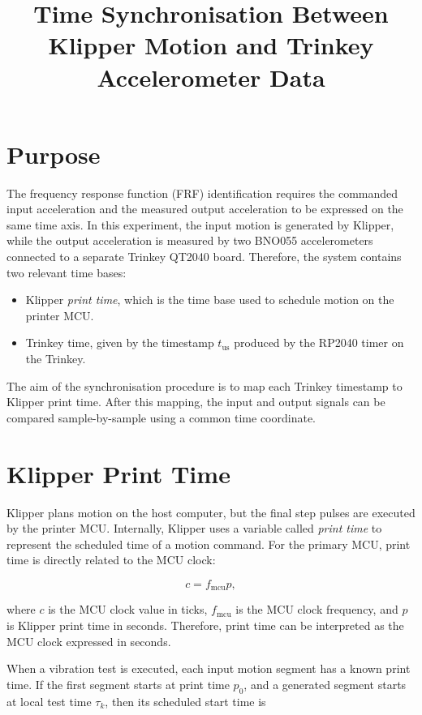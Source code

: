\documentclass[11pt,a4paper]{article}
\title{Time Synchronisation Between Klipper Motion and Trinkey Accelerometer Data}
\author{}
\date{}
\begin{document}
\maketitle

\section{Purpose}

The frequency response function (FRF) identification requires the commanded
input acceleration and the measured output acceleration to be expressed on the
same time axis. In this experiment, the input motion is generated by Klipper,
while the output acceleration is measured by two BNO055 accelerometers connected
to a separate Trinkey QT2040 board. Therefore, the system contains two relevant
time bases:

\begin{itemize}
    \item Klipper \emph{print time}, which is the time base used to schedule
    motion on the printer MCU.
    \item Trinkey time, given by the timestamp \(t_{\mathrm{us}}\) produced by
    the RP2040 timer on the Trinkey.
\end{itemize}

The aim of the synchronisation procedure is to map each Trinkey timestamp to
Klipper print time. After this mapping, the input and output signals can be
compared sample-by-sample using a common time coordinate.

\section{Klipper Print Time}

Klipper plans motion on the host computer, but the final step pulses are
executed by the printer MCU. Internally, Klipper uses a variable called
\emph{print time} to represent the scheduled time of a motion command. For the
primary MCU, print time is directly related to the MCU clock:

\begin{equation}
    c = f_{\mathrm{mcu}} p,
\end{equation}

where \(c\) is the MCU clock value in ticks, \(f_{\mathrm{mcu}}\) is the MCU
clock frequency, and \(p\) is Klipper print time in seconds. Therefore, print
time can be interpreted as the MCU clock expressed in seconds.

When a vibration test is executed, each input motion segment has a known print
time. If the first segment starts at print time \(p_0\), and a generated segment
starts at local test time \(\tau_k\), then its scheduled start time is
\end{document}
